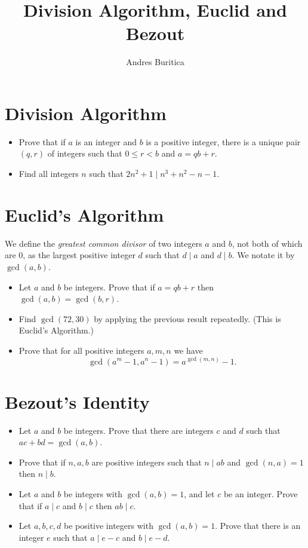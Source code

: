 \documentclass{article}
\title{Division Algorithm, Euclid and Bezout}
\author{Andres Buritica}
\date{}
\begin{document}
\maketitle
\section{Division Algorithm}
  \begin{itemize}
    \item Prove that if $a$ is an integer and $b$ is a positive integer, there
      is a unique pair $(q,r)$ of integers such that $0\le r<b$ and $a=qb+r$.
    \item Find all integers $n$ such that $2n^2+1\mid n^3+n^2-n-1$.
  \end{itemize}
\section{Euclid's Algorithm}
  We define the \emph{greatest common divisor} of two integers $a$ and $b$, not
  both of which are 0, as the largest positive integer $d$ such that $d\mid a$
  and $d\mid b$. We notate it by $\gcd(a,b)$.
  \begin{itemize}
    \item Let $a$ and $b$ be integers. Prove that if $a=qb+r$ then
      $\gcd(a,b)=\gcd(b,r)$.
    \item Find $\gcd(72,30)$ by applying the previous result repeatedly. (This
      is Euclid's Algorithm.)
    \item Prove that for all positive integers $a,m,n$ we have
      \[\gcd(a^m-1,a^n-1)=a^{\gcd(m,n)}-1.\]
  \end{itemize}
\section{Bezout's Identity}
  \begin{itemize}
    \item Let $a$ and $b$ be integers. Prove that there are integers $c$ and $d$
      such that $ac+bd=\gcd(a,b)$.
    \item Prove that if $n,a,b$ are positive integers such that $n\mid ab$ and
      $\gcd(n,a)=1$ then $n\mid b$.
    \item Let $a$ and $b$ be integers with $\gcd(a,b)=1$, and let $c$ be an
      integer. Prove that if $a\mid c$ and $b\mid c$ then $ab\mid c$.
    \item Let $a,b,c,d$ be positive integers with $\gcd(a,b)=1$. Prove that there is an integer $e$
      such that $a\mid e-c$ and $b\mid e-d$.
  \end{itemize}
\newpage
\end{document}
